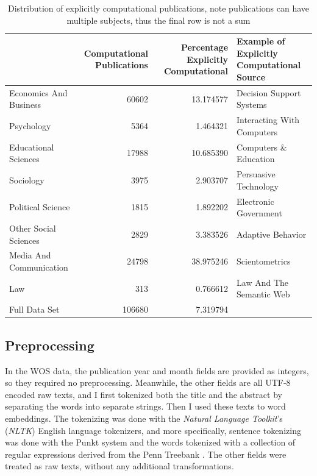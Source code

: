 \documentclass[12pt, a4paper]{article}
\begin{document}
\begin{table}[h]
	\centering
	\begin{adjustbox}{center}
		\begin{tabular}{lrrl}
			\toprule
			{} &  \pbox{20cm}{Computational\\ Publications} &  \pbox{20cm}{Percentage\\Explicitly Computational} &  \pbox{20cm}{Example of Explicitly\\Computational Source} \\
			\midrule
			Economics And Business  &           \num{60602} &        \num{13.174577} &    Decision Support Systems \\
			Psychology              &            \num{5364} &         \num{1.464321} &  Interacting With Computers \\
			Educational Sciences    &           \num{17988} &        \num{10.685390} &       Computers \& Education \\
			Sociology               &            \num{3975} &         \num{2.903707} &       Persuasive Technology \\
			Political Science       &            \num{1815} &         \num{1.892202} &       Electronic Government \\
			Other Social Sciences   &            \num{2829} &         \num{3.383526} &           Adaptive Behavior \\
			Media And Communication &           \num{24798} &        \num{38.975246} &              Scientometrics \\
			Law                     &             \num{313} &         \num{0.766612} &    Law And The Semantic Web \\
			\midrule
			Full Data Set           &          \num{106680} &         \num{7.319794} &   \\
			\bottomrule
		\end{tabular}
	\end{adjustbox}
	\caption{Distribution of explicitly computational publications, note publications can have multiple subjects, thus the final row is not a sum}\label{sum_comp}
\end{table}


\subsection{Preprocessing}

In the WOS data, the publication year and month fields are provided as integers, so they required no preprocessing. Meanwhile, the other fields are all UTF-8 encoded raw texts, and I first tokenized both the title and the abstract by separating the words into separate strings. Then I used these texts to word embeddings. The tokenizing was done with the \textit{Natural Language Toolkit}'s (\textit{NLTK}) \citep{bird2006nltk} English language tokenizers, and more specifically, sentence tokenizing was done with the Punkt system \citep{kiss2006unsupervised} and the words tokenized with a collection of regular expressions derived from the Penn Treebank \citep{marcus1993building}. The other fields were treated as raw texts, without any additional transformations.
\end{document}
